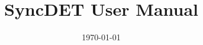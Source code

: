 \documentclass{article}
\begin{document}
\title{SyncDET User Manual}
\date{\today}

\maketitle
\tableofcontents





\end{document}
